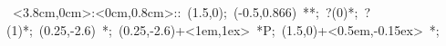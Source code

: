 %

\hbox{
\xy    <3.8cm,0cm>:<0cm,0.8cm>::
       (1.5,0); (-0.5,0.866) **\dir{-}; ?(0)*\dir{<}; ?(1)*\dir{>};
       (0.25,-2.6) *{\bullet};
       (0.25,-2.6)+<1em,1ex> *{P};
       (1.5,0)+<0.5em,-0.15ex> *{\ell};
\endxy}

